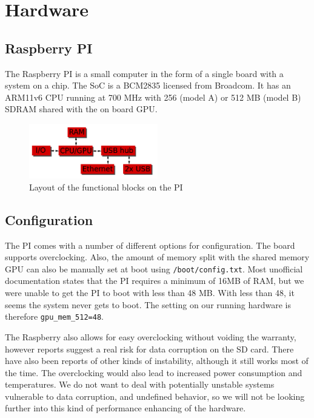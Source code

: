 \clearpage
\section{Hardware}
\label{sec:hardware}

\subsection{Raspberry PI}
The Raspberry PI is a small computer in the form of a single board with a system on a chip. The SoC is a BCM2835 licensed from Broadcom. It has an ARM11v6 CPU running at 700 MHz with 256 (model A) or 512 MB (model B) SDRAM shared with the on board GPU.
\begin{figure}[h]
    \includegraphics[width=0.5\textwidth]{hardware/raspberrypi_block_function}
    \caption{Layout of the functional blocks on the PI}
    \label{fig:pi_blockdiagram}
\end{figure}

\subsection{Configuration}
The PI comes with a number of different options for configuration. The board supports overclocking. Also, the amount of memory split with the shared memory GPU can also be manually set at boot using {\tt /boot/config.txt}.
Most unofficial documentation states that the PI requires a minimum of 16MB of RAM, but we were unable to get the PI to boot with less than 48 MB. 
With less than 48, it seems the system never gets to boot.
The setting on our running hardware is therefore {\tt gpu\_mem\_512=48}.

The Raspberry also allows for easy overclocking without voiding the warranty, however reports suggest a real risk for data corruption on the SD card. There have also been reports of other kinds of instability, although it still works most of the time.
The overclocking would also lead to increased power consumption and temperatures.
We do not want to deal with potentially unstable systems vulnerable to data corruption, and undefined behavior, so we will not be looking further into this kind of performance enhancing of the hardware.

